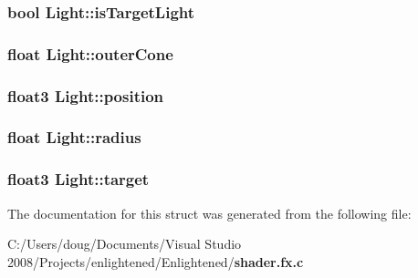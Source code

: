 \subsubsection[{isTargetLight}]{\setlength{\rightskip}{0pt plus 5cm}bool {\bf Light::isTargetLight}}\label{struct_light_a986bc50635faf4f74e51ebdb52354e30}
\subsubsection[{outerCone}]{\setlength{\rightskip}{0pt plus 5cm}float {\bf Light::outerCone}}\label{struct_light_a0badad92b7b4cf0115f0f7e2f30ab11d}
\subsubsection[{position}]{\setlength{\rightskip}{0pt plus 5cm}float3 {\bf Light::position}}\label{struct_light_a3db75a1b23b53fbd4d98da10dda1d52f}
\subsubsection[{radius}]{\setlength{\rightskip}{0pt plus 5cm}float {\bf Light::radius}}\label{struct_light_ab9a87981b02f4612c872c49efa6b6e53}
\subsubsection[{target}]{\setlength{\rightskip}{0pt plus 5cm}float3 {\bf Light::target}}\label{struct_light_ac7a0d5eed7975a29294ba1ff61fb75e4}


The documentation for this struct was generated from the following file:\begin{DoxyCompactItemize}
\item 
C:/Users/doug/Documents/Visual Studio 2008/Projects/enlightened/Enlightened/{\bf shader.fx.c}\end{DoxyCompactItemize}
